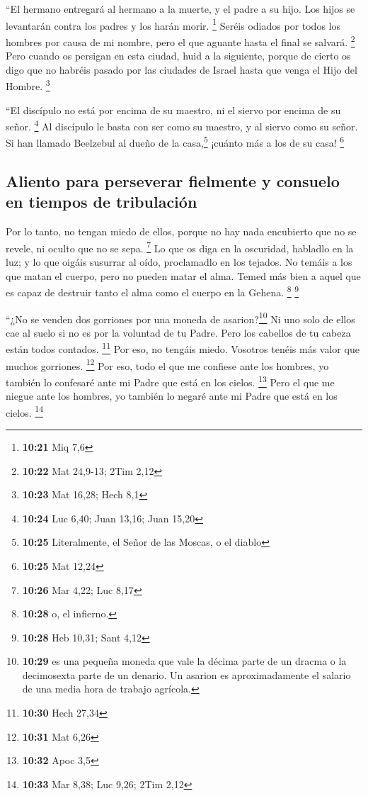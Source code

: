 \begin{paracol}{2}
 ``El hermano entregará al hermano a la muerte, y el
padre a su hijo. Los hijos se levantarán contra los padres y los harán
morir. \footnote{\textbf{10:21} Miq 7,6}  Seréis odiados
por todos los hombres por causa de mi nombre, pero el que aguante hasta
el final se salvará. \footnote{\textbf{10:22} Mat 24,9-13; 2Tim 2,12}
 Pero cuando os persigan en esta ciudad, huid a la
siguiente, porque de cierto os digo que no habréis pasado por las
ciudades de Israel hasta que venga el Hijo del Hombre. \footnote{\textbf{10:23}
  Mat 16,28; Hech 8,1}

 ``El discípulo no está por encima de su maestro, ni el
siervo por encima de su señor. \footnote{\textbf{10:24} Luc 6,40; Juan
  13,16; Juan 15,20}  Al discípulo le basta con ser como
su maestro, y al siervo como su señor. Si han llamado Beelzebul al dueño
de la casa,\footnote{\textbf{10:25} Literalmente, el Señor de las
  Moscas, o el diablo} ¡cuánto más a los de su casa! \footnote{\textbf{10:25}
  Mat 12,24}

\hypertarget{aliento-para-perseverar-fielmente-y-consuelo-en-tiempos-de-tribulaciuxf3n}{%
\subsection{Aliento para perseverar fielmente y consuelo en tiempos de
tribulación}\label{aliento-para-perseverar-fielmente-y-consuelo-en-tiempos-de-tribulaciuxf3n}}

 Por lo tanto, no tengan miedo de ellos, porque no hay
nada encubierto que no se revele, ni oculto que no se sepa. \footnote{\textbf{10:26}
  Mar 4,22; Luc 8,17}  Lo que os diga en la oscuridad,
habladlo en la luz; y lo que oigáis susurrar al oído, proclamadlo en los
tejados.  No temáis a los que matan el cuerpo, pero no
pueden matar el alma. Temed más bien a aquel que es capaz de destruir
tanto el alma como el cuerpo en la Gehena. \footnote{\textbf{10:28} o,
  el infierno.} \footnote{\textbf{10:28} Heb 10,31; Sant 4,12}

 ``¿No se venden dos gorriones por una moneda de
asarion?\footnote{\textbf{10:29} es una pequeña moneda que vale la
  décima parte de un dracma o la decimosexta parte de un denario. Un
  asarion es aproximadamente el salario de una media hora de trabajo
  agrícola.} Ni uno solo de ellos cae al suelo si no es por la voluntad
de tu Padre.  Pero los cabellos de tu cabeza están todos
contados. \footnote{\textbf{10:30} Hech 27,34}  Por eso,
no tengáis miedo. Vosotros tenéis más valor que muchos gorriones.
\footnote{\textbf{10:31} Mat 6,26}  Por eso, todo el que
me confiese ante los hombres, yo también lo confesaré ante mi Padre que
está en los cielos. \footnote{\textbf{10:32} Apoc 3,5} 
Pero el que me niegue ante los hombres, yo también lo negaré ante mi
Padre que está en los cielos. \footnote{\textbf{10:33} Mar 8,38; Luc
  9,26; 2Tim 2,12}


\end{paracol}
